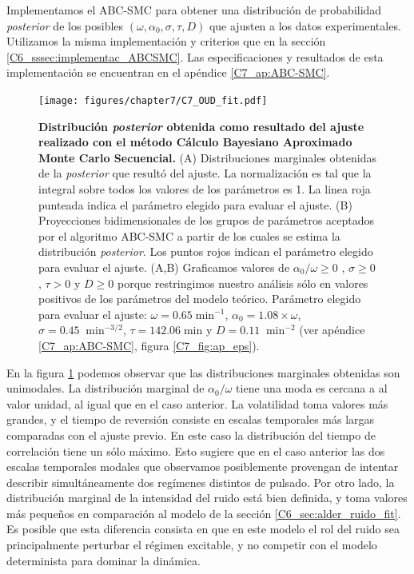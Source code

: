 \documentclass[./main.tex]{subfiles}
\begin{document}
Implementamos el ABC-SMC para obtener una distribución de probabilidad \textit{posterior} de los posibles $(\omega,\alpha_0,\sigma,\tau,D)$ que ajusten a los datos experimentales. Utilizamos la misma implementación y criterios que en la sección \ref{C6_sssec:implementac_ABCSMC}. Las especificaciones y resultados de esta implementación se encuentran en el apéndice \ref{C7_ap:ABC-SMC}.


\begin{figure}
    \centering
    \texttt{[image: figures/chapter7/C7\_OUD\_fit.pdf]} 
    \caption{\textbf{Distribución \textit{posterior} obtenida como resultado del ajuste realizado con el método Cálculo Bayesiano Aproximado Monte Carlo Secuencial.} (A) Distribuciones marginales obtenidas de la \textit{posterior} que resultó del ajuste. La normalización es tal que la integral sobre todos los valores de los parámetros es 1. La linea roja punteada indica el parámetro elegido para evaluar el ajuste. (B) Proyecciones bidimensionales de los grupos de parámetros aceptados por el algoritmo ABC-SMC a partir de los cuales se estima la distribución \textit{posterior}. Los puntos rojos indican el parámetro elegido para evaluar el ajuste. (A,B) Graficamos valores de $\alpha_0 / \omega \geq 0$ , $\sigma  \geq 0$, $\tau  > 0$ y $D  \geq 0$ porque restringimos nuestro análisis sólo en valores positivos de los parámetros del modelo teórico. Parámetro elegido para evaluar el ajuste: $\omega = 0.65 \; \text{min}^{-1}$, $\alpha_0 = 1.08 \times \omega$, $ \sigma = 0.45 \; \; \text{min}^{-3/2}$, $\tau = 142.06 \; \text{min} $ y $D = 0.11 \; \; \text{min}^{-2}$ (ver apéndice \ref{C7_ap:ABC-SMC}, figura \ref{C7_fig:ap_eps}).}
    \label{C7_fig:OUD_fit}
\end{figure} 


En la figura \ref{C7_fig:OUD_fit} podemos observar que las distribuciones marginales obtenidas son unimodales. La distribución marginal de $\alpha_0/\omega$ tiene una moda es cercana a al valor unidad, al igual que en el caso anterior. La volatilidad toma valores más grandes, y el tiempo de reversión consiste en escalas temporales más largas comparadas con el ajuste previo. En este caso la distribución del tiempo de correlación tiene un sólo máximo. Esto sugiere que en el caso anterior las dos escalas temporales modales que observamos posiblemente provengan de intentar describir simultáneamente dos regímenes distintos de pulsado. Por otro lado, la distribución marginal de la intensidad del ruido está bien definida, y toma valores más pequeños en comparación al modelo de la sección \ref{C6_sec:alder_ruido_fit}. Es posible que esta diferencia consista en que en este modelo el rol del ruido sea principalmente perturbar el régimen excitable, y no competir con el modelo determinista para dominar la dinámica. 
\end{document}
